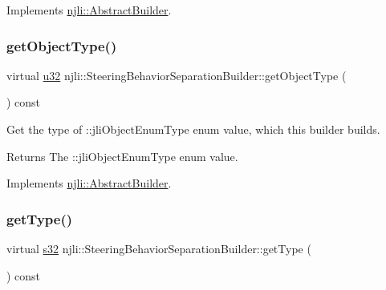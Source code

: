 Implements \mbox{\hyperlink{classnjli_1_1_abstract_builder_a902f73ea78031b06aca183a417f3413b}{njli\+::\+Abstract\+Builder}}.

\mbox{\label{classnjli_1_1_steering_behavior_separation_builder_abe06bf7685fc4a11087eab052bdd6345}} 
\subsubsection{\texorpdfstring{get\+Object\+Type()}{getObjectType()}}
{\footnotesize\ttfamily virtual \mbox{\hyperlink{_util_8h_a10e94b422ef0c20dcdec20d31a1f5049}{u32}} njli\+::\+Steering\+Behavior\+Separation\+Builder\+::get\+Object\+Type (\begin{DoxyParamCaption}{ }\end{DoxyParamCaption}) const\hspace{0.3cm}{\ttfamily [virtual]}}

Get the type of \+::jli\+Object\+Enum\+Type enum value, which this builder builds.

\begin{DoxyReturn}{Returns}
The \+::jli\+Object\+Enum\+Type enum value. 
\end{DoxyReturn}


Implements \mbox{\hyperlink{classnjli_1_1_abstract_builder_a0f2d344fcf697b167f4f2b1122b5fb33}{njli\+::\+Abstract\+Builder}}.

\mbox{\label{classnjli_1_1_steering_behavior_separation_builder_a8861f7768cbb12272e099439641885cc}} 
\subsubsection{\texorpdfstring{get\+Type()}{getType()}}
{\footnotesize\ttfamily virtual \mbox{\hyperlink{_util_8h_aa62c75d314a0d1f37f79c4b73b2292e2}{s32}} njli\+::\+Steering\+Behavior\+Separation\+Builder\+::get\+Type (\begin{DoxyParamCaption}{ }\end{DoxyParamCaption}) const\hspace{0.3cm}{\ttfamily [virtual]}}


